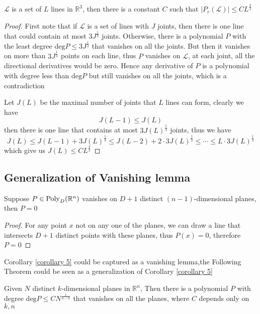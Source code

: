 \begin{theorem}\label{theorem 13}
$ \mathscr{L} $ is a set of $ L $ lines in $ \mathbb{R}^{3} $, then there is a constant $ C $ such that 
$ |P_{r}(\mathscr{L})| \leq CL^{\frac{3}{2}} $
\end{theorem}

\begin{proof}
First note that if $ \mathscr{L} $ is a set of lines with $ J $ joints, then there is one line that could contain at most $ 3J^{\frac{1}{3}} $ joints. Otherwise, there is a polynomial $ P $ with the least degree $ \mathrm{deg}P \leq 3J^{\frac{1}{3}} $ that vanishes on all the joints. But then it vanishes on more 
than $ 3J^{\frac{1}{3}} $ points on each line, thus $ P $ vanishes on $ \mathscr{L} $, at each joint, all the directional derivatives would be zero. Hence any derivative of $ P $ is a polynomial with degree less than $ \mathrm{deg}P $ but still vanishes on all the joints, which is a contradiction \par
Let $ J(L) $ be the maximal number of joints that $ L $ lines can form, clearly we have
$$ J(L-1) \leq J(L) $$
then there is one line that contains at most $ 3J(L)^{\frac{1}{3}} $ joints, thus we have
$$ J(L) \leq J(L-1) + 3J(L)^{\frac{1}{3}} \leq J(L-2) + 2 \cdot 3J(L)^{\frac{1}{3}}\leq \cdots \leq L \cdot 3J(L)^{\frac{1}{3}} $$
which give us $ J(L) \leq CL^{\frac{3}{2}} $
\end{proof}

\subsection{Generalization of Vanishing lemma}

\begin{lemma}\label{lemma 14}
Suppose $ P \in \operatorname{Poly}_{D}(\mathbb{R}^{n}) $ vanishes on $ D+1 $ distinct $ (n-1) $-dimensional planes, then $ P = 0 $
\end{lemma}

\begin{proof}
For any point $ x $ not on any one of the planes, we can draw a line that intersects $ D+1 $ distinct points 
with these planes, thus $ P(x) = 0 $, therefore $ P = 0 $
\end{proof}

Corollary \ref{corollary 5} could be captured as a vanishing lemma,the Following Theorem could be seen as a generalization of Corollary \ref{corollary 5}

\begin{theorem}\label{theorem 15}
Given $ N $ distinct $ k $-dimensional planes in $ \mathbb{R}^{n} $, Then there is a polynomial $ P $ with degree $ \mathrm{deg}P \leq CN^{\frac{1}{n-k}} $ that vanishes on all the planes, where $ C $ depends only on $ k,n $
\end{theorem}

